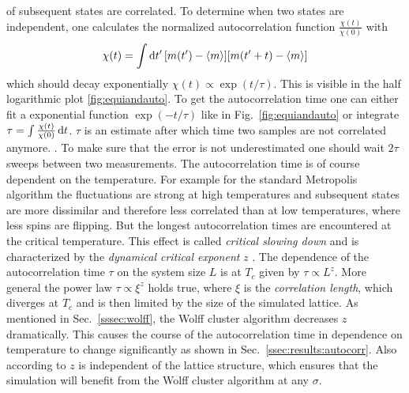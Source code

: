         of subsequent states are correlated. To determine when two states
        are independent, one calculates the normalized autocorrelation function
        \(\frac{\chi(t)}{\chi(0)}\) with
        \begin{equation}
            \chi(t) = \int \mathrm{d} t' \, [m(t') -\left< m \right>][m(t'+t)-\left< m \right>]
        \end{equation}
        which should decay exponentially
        \(\chi(t) \propto \exp(t/\tau)\). This is visible in the half
        logarithmic plot \ref{fig:equiandauto}.
        To get the autocorrelation time one can either fit a exponential
        function \(\exp(-t/\tau)\) like in Fig.\ \ref{fig:equiandauto}
        or integrate \(\tau = \int \frac{\chi(t)}{\chi(0)} \,\mathrm{d} t\).
        \(\tau\) is an estimate after which time two samples are not
        correlated anymore. \cite[p. 59ff]{NewmanBarkema1999} \cite[p. 150f]{Katzgraber2011}.
        To make sure that the error is not underestimated one should wait
        \(2\tau\) sweeps between two measurements.
        The autocorrelation time is of course dependent on the temperature.
        For example for the standard Metropolis algorithm the fluctuations
        are strong at high temperatures and subsequent
        states are more dissimilar and therefore less correlated than at low
        temperatures, where less spins are flipping. But the longest
        autocorrelation times are encountered at the critical temperature.
        This effect is called \emph{critical slowing down} and is
        characterized by the \emph{dynamical critical exponent} \(z\)
        \cite{SwendsenWang1987}. The dependence of the autocorrelation time
        \(\tau\) on the system size \(L\) is at \(T_{c}\) given by \(\tau \propto L^z\).
        More general the power law \(\tau \propto \xi^z\) holds true, where
        \(\xi\) is the \emph{correlation length}, which diverges at
        \(T_{c}\) and is then limited by the size of the simulated lattice.
        As mentioned in Sec.\ \ref{sssec:wolff}, the Wolff cluster algorithm
        decreases \(z\) dramatically. This causes the course of the autocorrelation
        time in dependence on temperature to change significantly as shown in
        Sec.\ \ref{ssec:results:autocorr}. Also according to \cite{NewmanBarkema1999}
        \(z\) is independent of the lattice structure, which ensures that
        the simulation will benefit from the Wolff cluster algorithm at
        any \(\sigma\).
